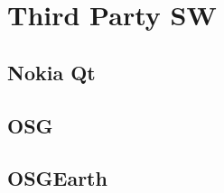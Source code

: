 %
%
%
%

\clearpage

\section{Third Party SW}

\subsection{Nokia Qt}

\subsection{OSG}

\subsection{OSGEarth}

\endinput